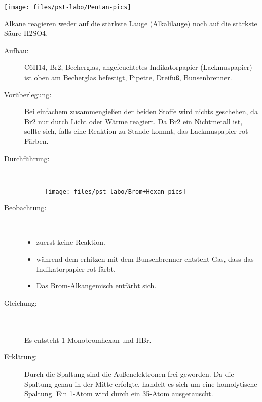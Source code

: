 \begin{figurewrapper}
	\texttt{[image: files/pst-labo/Pentan-pics]}
\end{figurewrapper}

Alkane reagieren weder auf die stärkste Lauge (Alkalilauge) noch auf die
stärkste Säure \ac{H2SO4}.

\begin{description}
	\item[Aufbau:] \ac{C6H14}, \ac{Br2}, Becherglas,
		angefeuchtetes Indikatorpapier (Lackmuspapier) ist oben am Becherglas befestigt,
		Pipette, Dreifuß, Bunsenbrenner.
	\item[Vorüberlegung:] Bei einfachem zusammengießen der beiden Stoffe wird nichts geschehen,
		da \ac{Br2} nur durch Licht oder Wärme reagiert. Da \ac{Br2} ein Nichtmetall ist,
		sollte sich, falls eine Reaktion zu Stande kommt, das Lackmuspapier rot Färben.
		\newpage
	\item[Durchführung:]~ \vspace{-2em}
	\begin{figure}[H]\centering
		\texttt{[image: files/pst-labo/Brom+Hexan-pics]}
	\end{figure}\vspace*{-1em}
	\item[Beobachtung:]~
	\begin{itemize}
		\item zuerst keine Reaktion.
		\item während dem erhitzen mit dem Bunsenbrenner entsteht Gas, dass das
			Indikatorpapier rot färbt.
		\item Das Brom-Alkangemisch entfärbt sich.
	\end{itemize}
	\item[Gleichung:] 
		\chemsign{+}  \\[0.8ex]
		\ce{->}\hspace{0.175cm} 
		\chemsign{+}  \\[0.8ex]
		Es entsteht 1-Monobromhexan und \ac{HBr}.
	\item[Erklärung:] Durch die Spaltung sind die Außenelektronen frei geworden.
		Da die Spaltung genau in der Mitte erfolgte, handelt es sich um eine homolytische Spaltung.
		Ein \ac{1}-Atom wird durch ein \ac{35}-Atom ausgetauscht.
\end{description}

